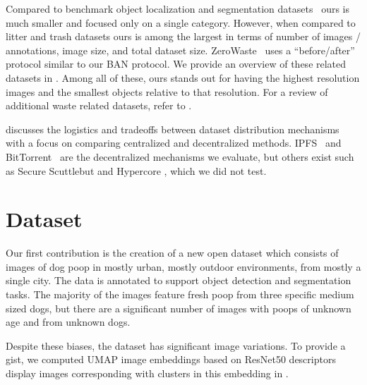 \documentclass{article}
\begin{document}
Compared to benchmark object localization and segmentation datasets~\cite{ILSVRC15,
  lin_microsoft_2014,cordts2015cityscapes} ours is much smaller and focused only on a single category.
However, when compared to litter and trash datasets
  \cite{bashkirova_zerowaste_2022,proenca_taco_2020,hong2020trashcansemanticallysegmenteddatasetvisual,mittal2016spotgarbage,rs13050965}
  ours is among the largest in terms of number of images / annotations, image size, and total dataset size.
ZeroWaste~\cite{bashkirova_zerowaste_2022} uses a ``before/after'' protocol similar to our BAN protocol.
We provide an overview of these related datasets in .
Among all of these, ours stands out for having the highest resolution images and the smallest objects
  relative to that resolution.
For a review of additional waste related datasets, refer to \cite{agnieszka_waste}.

 discusses the logistics and tradeoffs between dataset distribution mechanisms
  with a focus on comparing centralized and decentralized methods.
IPFS~\cite{benet_ipfs_2014} and BitTorrent~\cite{cohen_incentives_2003} are the decentralized 
  mechanisms we evaluate, but others exist such as Secure Scuttlebut \cite{tarr_secure_2019} and Hypercore
  \cite{frazee_dep-0002_nodate}, which we did not test.


\section{Dataset}
\label{sec:dataset}

Our first contribution is the creation of a new open dataset which consists of images of dog poop in mostly
  urban, mostly outdoor environments, from mostly a single city.
The data is annotated to support object detection and segmentation tasks.
The majority of the images feature fresh poop from three specific medium sized dogs, but there are
  a significant number of images with poops of unknown age and from unknown dogs.

Despite these biases, the dataset has significant image variations.
To provide a gist, we computed UMAP \cite{mcinnes_umap_2020} image embeddings based on ResNet50
  \cite{he2016deep} descriptors display images corresponding with clusters in this embedding in
  .
\end{document}
